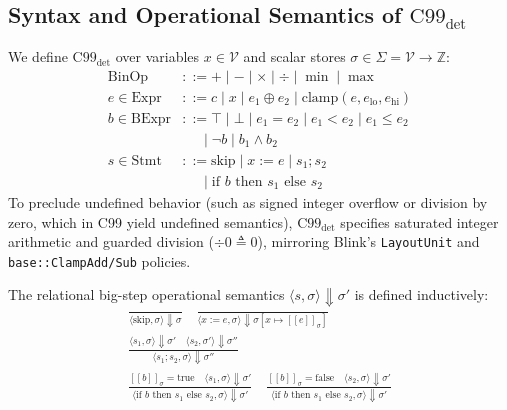 \documentclass[10pt,journal,compsoc]{IEEEtran}
\newcommand{\llbracket}{[\![}
\newcommand{\rrbracket}{]\!]}
\begin{document}
\subsection{Syntax and Operational Semantics of $\text{C99}_{\text{det}}$}
We define $\text{C99}_{\text{det}}$ over variables $x \in \mathcal{V}$ and scalar stores $\sigma \in \Sigma = \mathcal{V} \to \mathbb{Z}$:
\begin{align}
\text{BinOp} &::= + \mid - \mid \times \mid \div \mid \min \mid \max \\
e \in \text{Expr} &::= c \mid x \mid e_1 \oplus e_2 \mid \text{clamp}(e, e_{\text{lo}}, e_{\text{hi}}) \\
b \in \text{BExpr} &::= \top \mid \bot \mid e_1 = e_2 \mid e_1 < e_2 \mid e_1 \le e_2 \nonumber \\
&\quad\; \mid \neg b \mid b_1 \land b_2 \\
s \in \text{Stmt} &::= \text{skip} \mid x := e \mid s_1; s_2 \nonumber \\
&\quad\; \mid \text{if } b \text{ then } s_1 \text{ else } s_2
\end{align}
To preclude undefined behavior (such as signed integer overflow or division by zero, which in C99 yield undefined semantics), $\text{C99}_{\text{det}}$ specifies saturated integer arithmetic and guarded division ($\div 0 \triangleq 0$), mirroring Blink's \texttt{LayoutUnit} and \texttt{base::ClampAdd/Sub} policies.

The relational big-step operational semantics $\langle s, \sigma \rangle \Downarrow \sigma'$ is defined inductively:
\begin{gather}
\frac{}{\langle \text{skip}, \sigma \rangle \Downarrow \sigma} \quad
\frac{}{\langle x := e, \sigma \rangle \Downarrow \sigma[x \mapsto \llbracket e \rrbracket_\sigma]} \\[3pt]
\frac{\langle s_1, \sigma \rangle \Downarrow \sigma' \quad \langle s_2, \sigma' \rangle \Downarrow \sigma''}{\langle s_1; s_2, \sigma \rangle \Downarrow \sigma''} \\[3pt]
\frac{\llbracket b \rrbracket_\sigma = \text{true} \quad \langle s_1, \sigma \rangle \Downarrow \sigma'}{\langle \text{if } b \text{ then } s_1 \text{ else } s_2, \sigma \rangle \Downarrow \sigma'} \quad
\frac{\llbracket b \rrbracket_\sigma = \text{false} \quad \langle s_2, \sigma \rangle \Downarrow \sigma'}{\langle \text{if } b \text{ then } s_1 \text{ else } s_2, \sigma \rangle \Downarrow \sigma'}
\end{gather}
\end{document}
